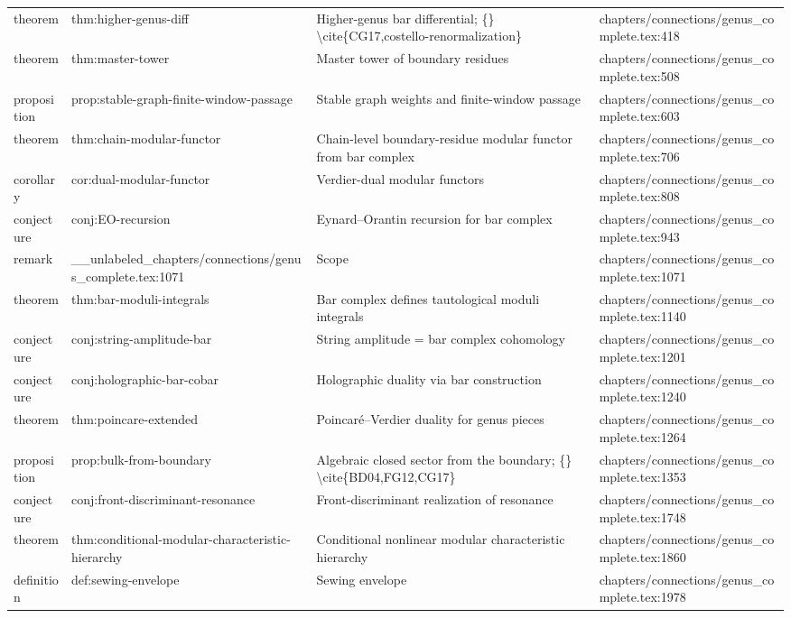 \documentclass[11pt]{article}
\begin{document}
\begin{longtable}{L{0.10\textwidth}L{0.26\textwidth}L{0.42\textwidth}L{0.22\textwidth}}
theorem & thm:higher-genus-diff & Higher-genus bar differential; \{\} \textbackslash{}cite\{CG17,costello-renormalization\} & chapters/connections/genus\_complete.tex:418\\
theorem & thm:master-tower & Master tower of boundary residues & chapters/connections/genus\_complete.tex:508\\
proposition & prop:stable-graph-finite-window-passage & Stable graph weights and finite-window passage & chapters/connections/genus\_complete.tex:603\\
theorem & thm:chain-modular-functor & Chain-level boundary-residue modular functor from bar complex & chapters/connections/genus\_complete.tex:706\\
corollary & cor:dual-modular-functor & Verdier-dual modular functors & chapters/connections/genus\_complete.tex:808\\
conjecture & conj:EO-recursion & Eynard--Orantin recursion for bar complex & chapters/connections/genus\_complete.tex:943\\
remark & \_\_unlabeled\_chapters/connections/genus\_complete.tex:1071 & Scope & chapters/connections/genus\_complete.tex:1071\\
theorem & thm:bar-moduli-integrals & Bar complex defines tautological moduli integrals & chapters/connections/genus\_complete.tex:1140\\
conjecture & conj:string-amplitude-bar & String amplitude = bar complex cohomology & chapters/connections/genus\_complete.tex:1201\\
conjecture & conj:holographic-bar-cobar & Holographic duality via bar construction & chapters/connections/genus\_complete.tex:1240\\
theorem & thm:poincare-extended & Poincaré--Verdier duality for genus pieces & chapters/connections/genus\_complete.tex:1264\\
proposition & prop:bulk-from-boundary & Algebraic closed sector from the boundary; \{\} \textbackslash{}cite\{BD04,FG12,CG17\} & chapters/connections/genus\_complete.tex:1353\\
conjecture & conj:front-discriminant-resonance & Front-discriminant realization of resonance & chapters/connections/genus\_complete.tex:1748\\
theorem & thm:cond{}itional-modular-characteristic-hierarchy & Cond{}itional nonlinear modular characteristic hierarchy & chapters/connections/genus\_complete.tex:1860\\
definition & def:sewing-envelope & Sewing envelope & chapters/connections/genus\_complete.tex:1978\\

\end{longtable}
\end{document}
